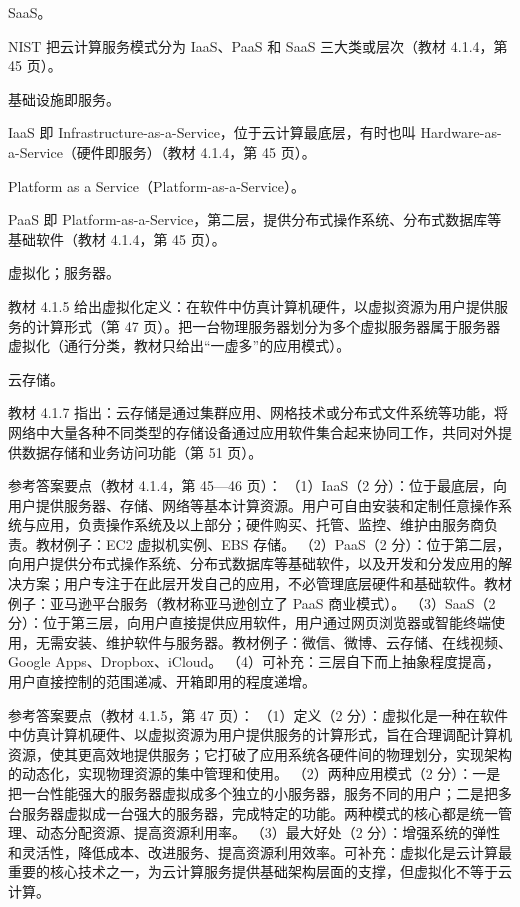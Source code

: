 \documentclass[a4paper,11pt]{article}
\begin{document}

\q SaaS。\begin{analysis}NIST 把云计算服务模式分为 IaaS、PaaS 和 SaaS 三大类或层次（教材 4.1.4，第 45 页）。\end{analysis}

\q 基础设施即服务。\begin{analysis}IaaS 即 Infrastructure-as-a-Service，位于云计算最底层，有时也叫 Hardware-as-a-Service（硬件即服务）（教材 4.1.4，第 45 页）。\end{analysis}

\q Platform as a Service（Platform-as-a-Service）。\begin{analysis}PaaS 即 Platform-as-a-Service，第二层，提供分布式操作系统、分布式数据库等基础软件（教材 4.1.4，第 45 页）。\end{analysis}

\q 虚拟化；服务器。\begin{analysis}教材 4.1.5 给出虚拟化定义：在软件中仿真计算机硬件，以虚拟资源为用户提供服务的计算形式（第 47 页）。把一台物理服务器划分为多个虚拟服务器属于服务器虚拟化（通行分类，教材只给出“一虚多”的应用模式）。\end{analysis}

\q 云存储。\begin{analysis}教材 4.1.7 指出：云存储是通过集群应用、网格技术或分布式文件系统等功能，将网络中大量各种不同类型的存储设备通过应用软件集合起来协同工作，共同对外提供数据存储和业务访问功能（第 51 页）。\end{analysis}


\q 参考答案要点（教材 4.1.4，第 45—46 页）：
（1）IaaS（2 分）：位于最底层，向用户提供服务器、存储、网络等基本计算资源。用户可自由安装和定制任意操作系统与应用，负责操作系统及以上部分；硬件购买、托管、监控、维护由服务商负责。教材例子：EC2 虚拟机实例、EBS 存储。
（2）PaaS（2 分）：位于第二层，向用户提供分布式操作系统、分布式数据库等基础软件，以及开发和分发应用的解决方案；用户专注于在此层开发自己的应用，不必管理底层硬件和基础软件。教材例子：亚马逊平台服务（教材称亚马逊创立了 PaaS 商业模式）。
（3）SaaS（2 分）：位于第三层，向用户直接提供应用软件，用户通过网页浏览器或智能终端使用，无需安装、维护软件与服务器。教材例子：微信、微博、云存储、在线视频、Google Apps、Dropbox、iCloud。
（4）可补充：三层自下而上抽象程度提高，用户直接控制的范围递减、开箱即用的程度递增。

\q 参考答案要点（教材 4.1.5，第 47 页）：
（1）定义（2 分）：虚拟化是一种在软件中仿真计算机硬件、以虚拟资源为用户提供服务的计算形式，旨在合理调配计算机资源，使其更高效地提供服务；它打破了应用系统各硬件间的物理划分，实现架构的动态化，实现物理资源的集中管理和使用。
（2）两种应用模式（2 分）：一是把一台性能强大的服务器虚拟成多个独立的小服务器，服务不同的用户；二是把多台服务器虚拟成一台强大的服务器，完成特定的功能。两种模式的核心都是统一管理、动态分配资源、提高资源利用率。
（3）最大好处（2 分）：增强系统的弹性和灵活性，降低成本、改进服务、提高资源利用效率。可补充：虚拟化是云计算最重要的核心技术之一，为云计算服务提供基础架构层面的支撑，但虚拟化不等于云计算。
\end{document}

